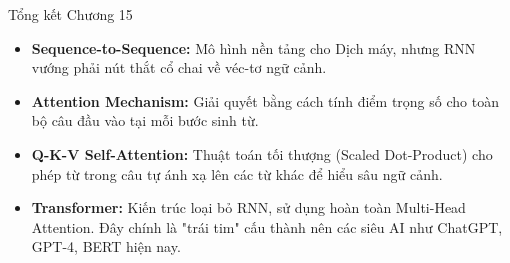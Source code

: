 \documentclass[aspectratio=169]{beamer}
\begin{document}
\begin{frame}{Tổng kết Chương 15}
    \begin{itemize}
        \item \textbf{Sequence-to-Sequence:} Mô hình nền tảng cho Dịch máy, nhưng RNN vướng phải nút thắt cổ chai về véc-tơ ngữ cảnh.
        \item \textbf{Attention Mechanism:} Giải quyết bằng cách tính điểm trọng số cho toàn bộ câu đầu vào tại mỗi bước sinh từ.
        \item \textbf{Q-K-V Self-Attention:} Thuật toán tối thượng (Scaled Dot-Product) cho phép từ trong câu tự ánh xạ lên các từ khác để hiểu sâu ngữ cảnh.
        \item \textbf{Transformer:} Kiến trúc loại bỏ RNN, sử dụng hoàn toàn Multi-Head Attention. Đây chính là "trái tim" cấu thành nên các siêu AI như ChatGPT, GPT-4, BERT hiện nay.
    \end{itemize}
\end{frame}
\end{document}
